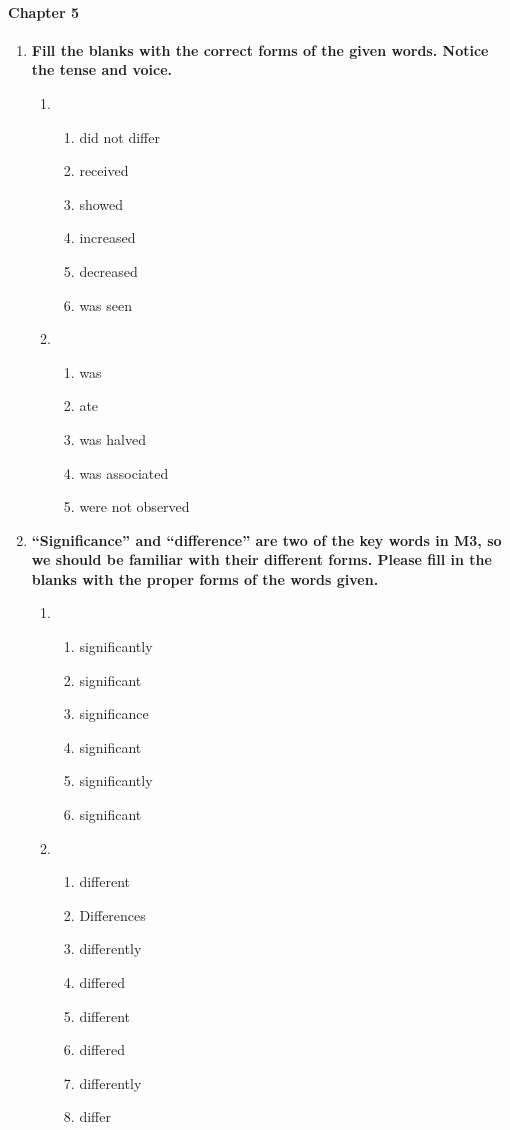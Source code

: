 \documentclass[a4paper]{ctexbook}
\begin{document}
\paragraph*{Chapter 5}\par
\begin{enumerate}
  \item \textbf{Fill the blanks with the correct forms of the given words. Notice the tense and voice.}
  \begin{enumerate}
    \item ~
    \begin{enumerate}
      \item did not differ
      \item received
      \item showed
      \item increased
      \item decreased
      \item was seen
    \end{enumerate}
    
    \item ~
    \begin{enumerate}
      \item was
      \item ate
      \item was halved
      \item was associated
      \item were not observed
    \end{enumerate}
  \end{enumerate}

  \item \textbf{``Significance'' and ``difference'' are two of the key words in M3, so we should be familiar with their different forms. Please fill in the blanks with the proper forms of the words given.}
  \begin{enumerate}
    \item ~
    \begin{enumerate}
      \item significantly
      \item significant
      \item significance
      \item significant
      \item significantly
      \item significant
    \end{enumerate}

    \item ~
    \begin{enumerate}
      \item different
      \item Differences
      \item differently
      \item differed
      \item different
      \item differed
      \item differently
      \item differ
    \end{enumerate}
  \end{enumerate}
\end{enumerate}
\end{document}
